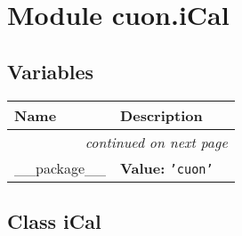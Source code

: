 %
%
%


\section{Module cuon.iCal}

    \label{cuon:iCal}


  \subsection{Variables}

    \vspace{-1cm}
\hspace{\varindent}\begin{longtable}{|p{\varnamewidth}|p{\vardescrwidth}|l}
\cline{1-2}
\cline{1-2} \centering \textbf{Name} & \centering \textbf{Description}& \\
\cline{1-2}
\endhead\cline{1-2}\multicolumn{3}{r}{\small\textit{continued on next page}}\\\endfoot\cline{1-2}
\endlastfoot\raggedright \_\-\_\-p\-a\-c\-k\-a\-g\-e\-\_\-\_\- & \raggedright \textbf{Value:} 
{\tt \texttt{'}\texttt{cuon}\texttt{'}}&\\
\cline{1-2}
\end{longtable}



\subsection{Class iCal}

